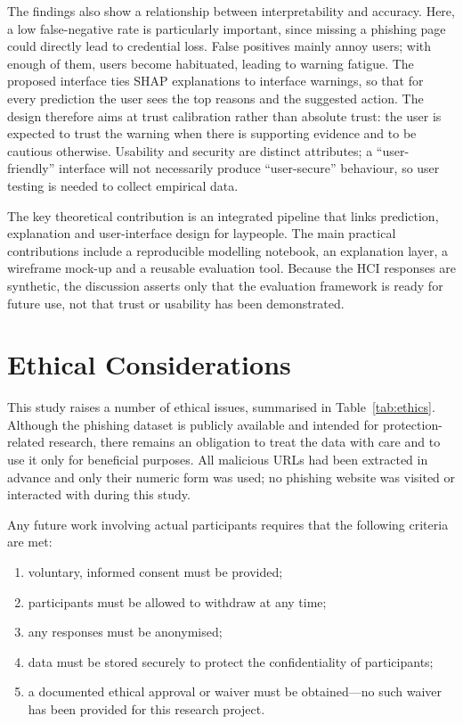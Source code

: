 \documentclass[11pt,a4paper]{article}
\begin{document}
The findings also show a relationship between interpretability and accuracy. Here, a low
false-negative rate is particularly important, since missing a phishing page could directly lead
to credential loss. False positives mainly annoy users; with enough of them, users become
habituated, leading to warning fatigue. The proposed interface ties SHAP explanations to
interface warnings, so that for every prediction the user sees the top reasons and the suggested
action. The design therefore aims at trust calibration rather than absolute trust: the user is
expected to trust the warning when there is supporting evidence and to be cautious otherwise.
Usability and security are distinct attributes; a ``user-friendly'' interface will not
necessarily produce ``user-secure'' behaviour, so user testing is needed to collect empirical
data.

The key theoretical contribution is an integrated pipeline that links prediction, explanation
and user-interface design for laypeople. The main practical contributions include a reproducible
modelling notebook, an explanation layer, a wireframe mock-up and a reusable evaluation tool.
Because the HCI responses are synthetic, the discussion asserts only that the evaluation
framework is ready for future use, not that trust or usability has been demonstrated.

\section{Ethical Considerations}

This study raises a number of ethical issues, summarised in Table~\ref{tab:ethics}. Although the
phishing dataset is publicly available and intended for protection-related research, there
remains an obligation to treat the data with care and to use it only for beneficial purposes. All
malicious URLs had been extracted in advance and only their numeric form was used; no phishing
website was visited or interacted with during this study.

Any future work involving actual participants requires that the following criteria are met:

\begin{enumerate}[topsep=2pt]
\item voluntary, informed consent must be provided;
\item participants must be allowed to withdraw at any time;
\item any responses must be anonymised;
\item data must be stored securely to protect the confidentiality of participants;
\item a documented ethical approval or waiver must be obtained---no such waiver has been
provided for this research project.
\end{enumerate}
\end{document}
